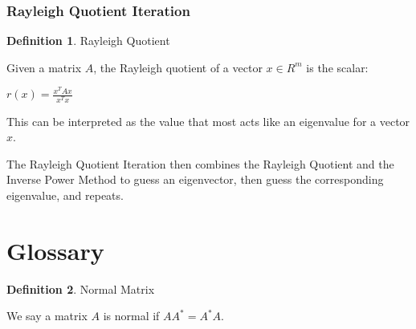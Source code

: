 \documentclass{article}
\theoremstyle{definition}
\newtheorem{definition}{Definition}[section]
\begin{document}
\subsubsection{Rayleigh Quotient Iteration}

\begin{definition}{Rayleigh Quotient}

Given a matrix $A$, the Rayleigh quotient of a vector $x \in R^m$ is the scalar:

$r(x) = \frac{x^T A x}{x^T x}$

This can be interpreted as the value that most acts like an eigenvalue for a vector $x$.

\end{definition}

\vspace{3ex}
The Rayleigh Quotient Iteration then combines the Rayleigh Quotient and the Inverse Power Method to guess an eigenvector, then guess the corresponding eigenvalue, and repeats.

\pagebreak

\section{Glossary}

\begin{definition}{Normal Matrix}

We say a matrix $A$ is normal if $A A^* = A^* A$.

\end{definition}
\end{document}
